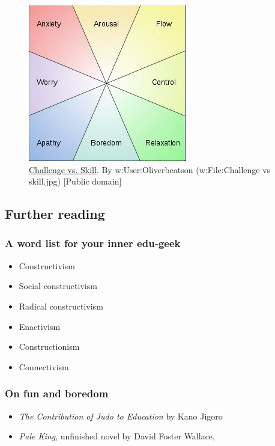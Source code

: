 \begin{figure}
\begin{center}
\includegraphics[width=.5\textwidth]{./pictures/challenge.jpg} 
\end{center}
\caption{
\href{http://commons.wikimedia.org/wiki/File\%3AChallenge\_vs\_skill.svg}{Challenge vs. Skill}. By w:User:Oliverbeatson (w:File:Challenge vs skill.jpg)
{[}Public domain{]}}
\end{figure}

\subsection{Further reading}

\subsubsection{A word list for your inner edu-geek}

\begin{itemize}
\item
  Constructivism
\item
  Social constructivism
\item
  Radical constructivism
\item
  Enactivism
\item
  Constructionism
\item
  Connectivism
\end{itemize}

\subsubsection{On fun and boredom}

\begin{itemize}
\item
  \emph{The Contribution of Judo to Education} by Kano Jigoro
\item
  \emph{Pale King}, unfinished novel by David Foster Wallace,
\end{itemize}

